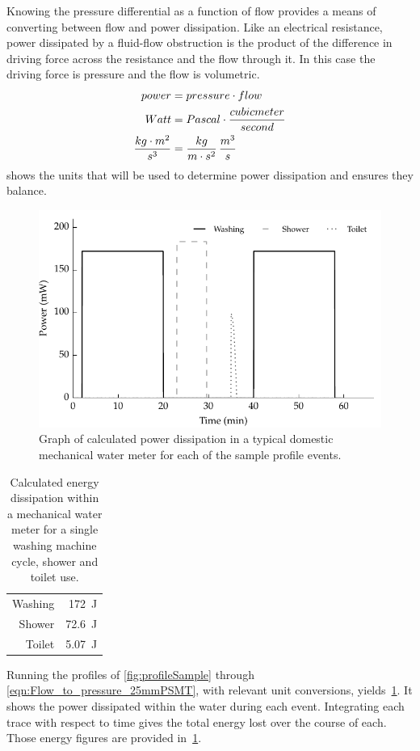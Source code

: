     Knowing the pressure differential as a function of flow provides a means of converting between flow and power dissipation.
    Like an electrical resistance, power dissipated by a fluid-flow obstruction is the product of the difference in driving force across the resistance and the flow through it.
    In this case the driving force is pressure and the flow is volumetric.
    \begin{align}
      \label{eqn:pressure_flow_to_power}
      power &= pressure \cdot flow\nonumber \\
      Watt &= Pascal \cdot \frac{cubic meter}{second}\nonumber \\
      \frac{kg\cdot m^{2}}{s^{3}} &= \frac{kg}{m\cdot  s^{2}} \thinspace \frac{m^{3}}{s}
    \end{align}
     shows the units that will be used to determine power dissipation and ensures they balance.
    \begin{figure}
        \centering
        \includegraphics[width=\linewidth]{content/pt1/02-WirelessWaterMeter/graphics/graph_harvest}
        \caption{Graph of calculated power dissipation in a typical domestic mechanical water meter for each of the sample profile events.}
        \label{fig:powerDissipated_meter}
    \end{figure}
    \begin{table}
      \centering
      \begin{tabular}{r|r}
          Washing & \SI{172}{\joule}\\
          Shower  & \SI{72.6}{\joule}\\
          Toilet  & \SI{5.07}{\joule}
      \end{tabular}
      \caption{
        \label{tab:energy_dissipation_figures}
        Calculated energy dissipation within a mechanical water meter for a single washing machine cycle, shower and toilet use.
      }
    \end{table}
    Running the profiles of \cref{fig:profileSample} through \cref{eqn:Flow_to_pressure_25mmPSMT}, with relevant unit conversions, yields~\cref{fig:powerDissipated_meter}.
    It shows the power dissipated within the water during each event.
    Integrating each trace with respect to time gives the total energy lost over the course of each.
    Those energy figures are provided in~\cref{tab:energy_dissipation_figures}.

